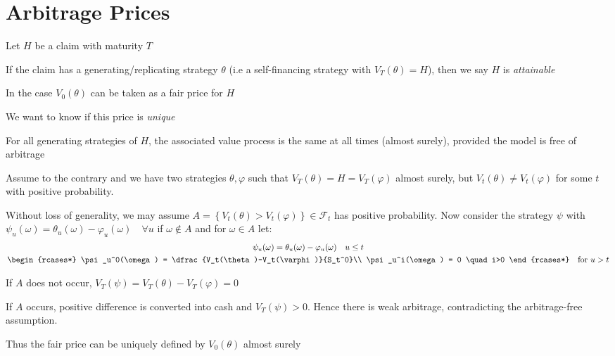 \section{Arbitrage Prices}
\begin{defo}{}
  \noindent Let $H$ be a claim with maturity $T$\par
  \noindent If the claim has a generating/replicating strategy $\theta$ (i.e a self-financing strategy with $V_T(\theta)=H$), then we say $H$ is \textit{attainable}
\end{defo}
\par\bigskip
\noindent In the case $V_0(\theta)$ can be taken as a fair price for $H$\par
\noindent We want to know if this price is \textit{unique}
\par\bigskip
\begin{lem}[]{}
  For all generating strategies of $H$, the associated value process is the same at all times (almost surely), provided the model is free of arbitrage
\end{lem}
\par\bigskip
\begin{prf}[]{}
  Assume to the contrary and we have two strategies $\theta,\varphi$ such that $V_T(\theta) = H=V_T(\varphi)$ almost surely, but $V_t(\theta)\neq V_t(\varphi)$ for some $t$ with positive probability.\par
\noindent Without loss of generality, we may assume $A = \left\{V_t(\theta)>V_t(\varphi)\right\}\in\mathcal{F}_t$ has positive probability. Now consider the strategy $\psi$ with $\psi_u(\omega) = \theta_u(\omega)-\varphi_u(\omega)\quad\forall u$ if $\omega\not\in A$ and for $\omega\in A$ let:
\begin{equation*}
  \begin{gathered}
    \psi_u(\omega) = \theta_u(\omega)-\varphi_u(\omega)\quad u\leq t\\
    \begin{rcases*}
      \psi_u^0(\omega) = \dfrac{V_t(\theta)-V_t(\varphi)}{S_t^0}\\
      \psi_u^i(\omega) = 0 \quad i>0
    \end{rcases*}\quad\text{for } u>t
  \end{gathered}
\end{equation*}
\par\bigskip
\noindent If $A$ does not occur, $V_T(\psi) = V_T(\theta)-V_T(\varphi) = 0$\par
\noindent If $A$ occurs, positive difference is converted into cash and $V_T(\psi)>0$. Hence there is weak arbitrage, contradicting the arbitrage-free assumption.
\end{prf}
\par\bigskip
\noindent Thus the fair price can be uniquely defined by $V_0(\theta)$ almost surely
\par\bigskip
